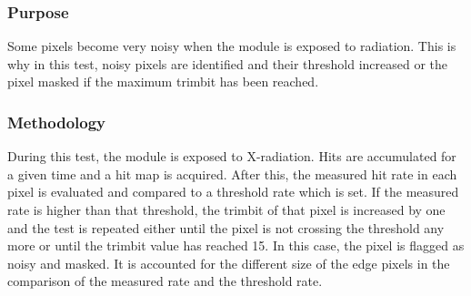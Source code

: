 \documentclass[a4paper,12pt,twoside]{article}
\begin{document}
\subsubsection{Purpose}
Some pixels become very noisy when the module is exposed to radiation. This is why in this test, noisy pixels are identified and their threshold increased or the pixel masked if the maximum trimbit has been reached.
\subsubsection{Methodology}
During this test, the module is exposed to X-radiation. Hits are accumulated for a given time and a hit map is acquired. After this, the measured hit rate in each pixel is evaluated and compared to a threshold rate which is set. If the measured rate is higher than that threshold, the trimbit of that pixel is increased by one and the test is repeated either until the pixel is not crossing the threshold any more or until the trimbit value has reached 15. In this case, the pixel is flagged as noisy and masked. 
It is accounted for the different size of the edge pixels in the comparison of the measured rate and the threshold rate.
\end{document}
